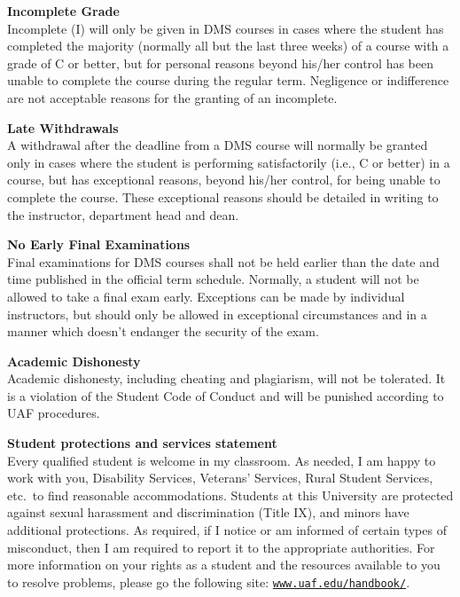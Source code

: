\documentclass[12pt]{article}
\renewcommand{\emph}[1]{\textsf{\textbf{#1}}}
\newcommand{\localhead}[1]{\par\smallskip\textbf{#1} \smallskip\nobreak\\}%
\def\subheading#1{\localhead{\emph{#1}}}
\begin{document}
\subheading{Incomplete Grade} 
Incomplete (I) will only be given in
  DMS courses in cases where
  the student has completed the majority (normally all but the last
  three weeks) of a course with a grade of C or better, but for
  personal reasons beyond his/her control has been unable to complete
  the course during the regular term. Negligence or indifference are
  not acceptable reasons for the granting of an incomplete. 

\subheading{Late Withdrawals} 
A withdrawal after the deadline from a DMS course will
  normally be granted only in cases where the student is performing
  satisfactorily (i.e., C or better) in a course, but has exceptional
  reasons, beyond his/her control, for being unable to complete the
  course. These exceptional reasons should be detailed in writing to
  the instructor, department head and dean.

\subheading{No Early Final Examinations}
Final examinations for DMS
  courses shall not be held earlier than the date and time published
  in the official term schedule. Normally, a student will not be
  allowed to take a final exam early. Exceptions can be made by
  individual instructors, but should only be allowed in exceptional
  circumstances and in a manner which doesn't endanger the security of
  the exam.

\subheading{Academic Dishonesty}
Academic dishonesty, including cheating and plagiarism, will not
be tolerated.  It is a violation of the Student Code of Conduct
and will be punished according to UAF procedures.


\subheading{Student protections and services statement}
Every qualified student is welcome in my classroom.  As needed, I am happy to work with you, Disability Services, Veterans' Services, Rural Student Services, etc.~to find reasonable accommodations.  Students at this University are protected against sexual harassment and discrimination (Title IX), and minors have additional protections.  As required, if I notice or am informed of certain types of misconduct, then I am required to report it to the appropriate authorities.  For more information on your rights as a student and the resources available to you to resolve problems, please go the following site: \href{https://www.uaf.edu/handbook/}{\texttt{www.uaf.edu/handbook/}}.

\clearpage\newpage
\end{document}
